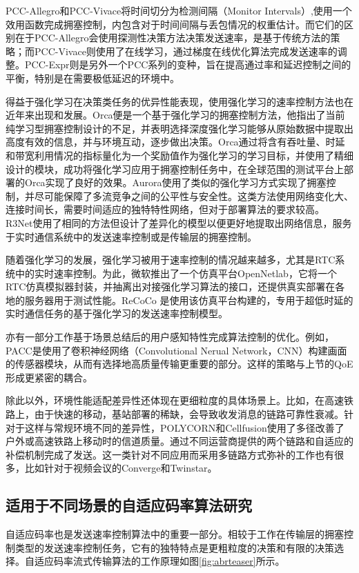 PCC-Allegro\cite{dong2015pcc}和PCC-Vivace\cite{dong2018pcc}将时间切分为检测间隔（Monitor Intervals）,使用一个效用函数完成拥塞控制，内包含对于时间间隔与丢包情况的权重估计。而它们的区别在于PCC-Allegro会使用探测性决策方法决策发送速率，是基于传统方法的策略；而PCC-Vivace则使用了在线学习，通过梯度在线优化算法完成发送速率的调整。PCC-Expr则是另外一个PCC系列的变种，旨在提高通过率和延迟控制之间的平衡，特别是在需要极低延迟的环境中。

得益于强化学习在决策类任务的优异性能表现\cite{mnih2013playing}，使用强化学习的速率控制方法也在近年来出现和发展。Orca\cite{abbasloo2020classic}便是一个基于强化学习的拥塞控制方法，他指出了当前纯学习型拥塞控制设计的不足，并表明选择深度强化学习能够从原始数据中提取出高度有效的信息，并与环境互动，逐步做出决策。Orca通过将含有吞吐量、时延和带宽利用情况的指标量化为一个奖励值作为强化学习的学习目标，并使用了精细设计的模块，成功将强化学习应用于拥塞控制任务中，在全球范围的测试平台上部署的Orca实现了良好的效果。Aurora\cite{jay2019deep}使用了类似的强化学习方式实现了拥塞控制，并尽可能保障了多流竞争之间的公平性与安全性。这类方法使用网络变化大、连接时间长，需要时间适应的独特特性网络，但对于部署算法的要求较高。 R3Net\cite{fang2019reinforcement}使用了相同的方法但设计了差异化的模型以便更好地提取出网络信息，服务于实时通信系统中的发送速率控制或是传输层的拥塞控制。

随着强化学习的发展，强化学习被用于速率控制的情况越来越多，尤其是RTC系统中的实时速率控制。为此，微软推出了一个仿真平台OpenNetlab\cite{eo2022opennetlab}，它将一个RTC仿真模拟器封装，并抽离出对接强化学习算法的接口，还提供真实部署在各地的服务器用于测试性能。ReCoCo\cite{markudova2023recoco} 是使用该仿真平台构建的，专用于超低时延的实时通信任务的基于强化学习的发送速率控制模型。


亦有一部分工作基于场景总结后的用户感知特性完成算法控制的优化。例如，PACC\cite{peng2023pacc}是使用了卷积神经网络（Convolutional Nerual Network，CNN）构建画面的传感器模块，从而有选择地高质量传输更重要的部分。这样的策略与上节的QoE形成更紧密的耦合。


除此以外，环境性能适配差异性还体现在更细粒度的具体场景上。比如，在高速铁路上，由于快速的移动，基站部署的稀缺，会导致收发消息的链路可靠性衰减。针对于这样与常规环境不同的差异性，POLYCORN\cite{ni2023polycorn}和Cellfusion\cite{ni2023cellfusion}使用了多径改善了户外或高速铁路上移动时的信道质量。通过不同运营商提供的两个链路和自适应的补偿机制完成了发送。这一类针对不同应用而采用多链路方式弥补的工作也有很多，比如针对于视频会议的Converge\cite{dhawaskar2023converge}和Twinstar\cite{wang2023twinstar}。

\subsection{适用于不同场景的自适应码率算法研究}
自适应码率也是发送速率控制算法中的重要一部分。相较于工作在传输层的拥塞控制类型的发送速率控制任务，它有的独特特点是更粗粒度的决策和有限的决策选择。自适应码率流式传输算法的工作原理如图\ref{fig:abrteaser}所示。

